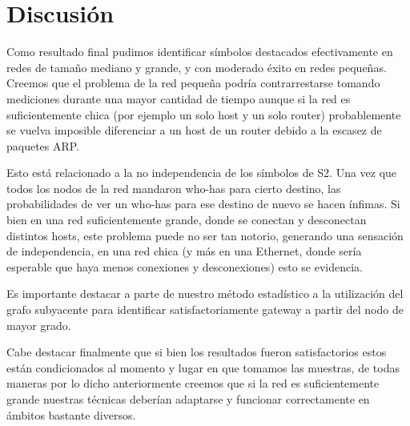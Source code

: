 \section{Discusión}

Como resultado final pudimos identificar símbolos destacados efectivamente en redes de tamaño mediano y grande, y con moderado éxito en redes pequeñas. Creemos que el problema de la red pequeña podría contrarrestarse tomando mediciones durante una mayor cantidad de tiempo aunque si la red es suficientemente chica (por ejemplo un solo host y un solo router) probablemente se vuelva imposible diferenciar a un host de un router debido a la escasez de paquetes ARP.

Esto está relacionado a la no independencia de los símbolos de S2. Una vez que todos los nodos de la red mandaron who-has para cierto destino, las probabilidades de ver un who-has para ese destino de nuevo se hacen ínfimas. Si bien en una red suficientemente grande, donde se conectan y desconectan distintos hosts, este problema puede no ser tan notorio, generando una sensación de independencia, en una red chica (y más en una Ethernet, donde sería esperable que haya menos conexiones y desconexiones) esto se evidencia.

Es importante destacar a parte de nuestro método estadístico a la utilización del grafo subyacente para identificar satisfactoriamente gateway a partir del nodo de mayor grado.

Cabe destacar finalmente que si bien los resultados fueron satisfactorios estos están condicionados al momento y lugar en que tomamos las muestras, de todas maneras por lo dicho anteriormente creemos que si la red es suficientemente grande nuestras técnicas deberían adaptarse y funcionar correctamente en ámbitos bastante diversos.

